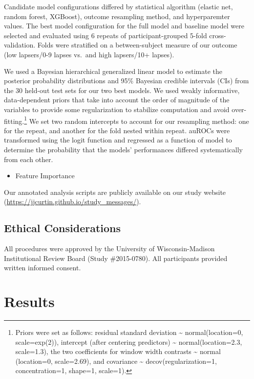\documentclass[
  letterpaper,
  DIV=11,
  numbers=noendperiod]{scrartcl}
\providecommand{\tightlist}{%
  \setlength{\itemsep}{0pt}\setlength{\parskip}{0pt}}\usepackage{longtable,booktabs,array}
\begin{document}
Candidate model configurations differed by statistical algorithm
(elastic net, random forest, XGBoost), outcome resampling method, and
hyperparemter values. The best model configuration for the full model
and baseline model were selected and evaluated using 6 repeats of
participant-grouped 5-fold cross-validation. Folds were stratified on a
between-subject measure of our outcome (low lapsers/0-9 lapses vs.~and
high lapsers/10+ lapses).

We used a Bayesian hierarchical generalized linear model to estimate the
posterior probability distributions and 95\% Bayesian credible intervals
(CIs) from the 30 held-out test sets for our two best models. We used
weakly informative, data-dependent priors that take into account the
order of magnitude of the variables to provide some regularization to
stabilize computation and avoid over-fitting.\footnote{Priors were set
  as follows: residual standard deviation \textasciitilde{}
  normal(location=0, scale=exp(2)), intercept (after centering
  predictors) \textasciitilde{} normal(location=2.3, scale=1.3), the two
  coefficients for window width contrasts \textasciitilde{} normal
  (location=0, scale=2.69), and covariance \textasciitilde{}
  decov(regularization=1, concentration=1, shape=1, scale=1).} We set
two random intercepts to account for our resampling method: one for the
repeat, and another for the fold nested within repeat. auROCs were
transformed using the logit function and regressed as a function of
model to determine the probability that the models' performances
differed systematically from each other.

\begin{itemize}
\tightlist
\item
  Feature Importance
\end{itemize}

Our annotated analysis scripts are publicly available on our study
website (\url{https://jjcurtin.github.io/study_messages/}).

\subsection{Ethical Considerations}\label{ethical-considerations}

All procedures were approved by the University of Wisconsin-Madison
Institutional Review Board (Study \#2015-0780). All participants
provided written informed consent.

\section{Results}\label{results}
\end{document}
